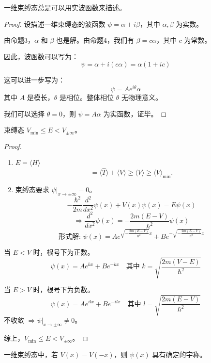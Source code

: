 \documentclass[lang=cn,10pt]{elegantbook}
\begin{document}
\begin{proposition}
	一维束缚态总是可以用实波函数来描述。
\end{proposition}

\begin{proof}
	设描述一维束缚态的波函数 $\psi = \alpha + i\beta$，其中 $\alpha, \beta$ 为实数。
	
	由命题3，$\alpha$ 和 $\beta$ 也是解。由命题4，我们有 $\beta = c\alpha$，其中 $c$ 为常数。
	
	因此，波函数可以写为：
	\[
	\psi = \alpha + i(c\alpha) = \alpha(1 + ic)
	\]
	
	这可以进一步写为：
	\[
	\psi = A e^{i\theta}\alpha
	\]
	其中 $A$ 是模长，$\theta$ 是相位。整体相位 $\theta$ 无物理意义。
	
	我们可以选择 $\theta = 0$，则 $\psi = A\alpha$ 为实函数，证毕。
\end{proof}
\begin{proposition}
	束缚态 $V_{\text{min}} \leq E < V_{\pm\infty}$。
\end{proposition}

\begin{proof}
	\begin{enumerate}
		\item $E = \langle H \rangle$
		\[
		= \langle \hat{T} \rangle + \langle V \rangle \geq \langle V \rangle \geq \langle V \rangle_{\text{min}}.
		\]
		\item 束缚态要求 $\psi \big|_{x \to \pm\infty} = 0$。
		\[
		-\frac{\hbar^2}{2m} \frac{d^2}{dx^2} \psi(x) + V(x) \psi(x) = E \psi(x)
		\]
		\[
		\Longrightarrow \frac{d^2}{dx^2} \psi(x) = -\frac{2m(E-V)}{\hbar^2} \psi(x)
		\]
		\[
		\text{形式解: } \psi(x) = A e^{\sqrt{-\frac{2m(E-V)}{\hbar^2}} x} + B e^{-\sqrt{-\frac{2m(E-V)}{\hbar^2}} x}
		\]
	\end{enumerate}
	
	当 $E < V$ 时，根号下为正数。
	\[
	\psi(x) = A e^{kx} + B e^{-kx} \quad \text{其中 } k = \sqrt{\frac{2m(V-E)}{\hbar^2}}
	\]
	
	当 $E > V$ 时，根号下为负数。
	\[
	\psi(x) = A e^{ilx} + B e^{-ilx} \quad \text{其中 } l = \sqrt{\frac{2m(E-V)}{\hbar^2}}
	\]
	不收敛 $\Rightarrow \psi \big|_{x \to \pm\infty} \neq 0$。
	
	综上，$V_{\text{min}} \leq E < V_{\pm\infty}$。
\end{proof}
\begin{proposition}
	一维束缚态中，若 $V(x) = V(-x)$，则 $\psi(x)$ 具有确定的宇称。
\end{proposition}
\end{document}
